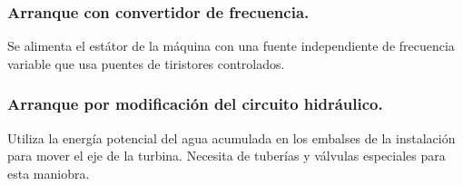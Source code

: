 			\subsubsection{Arranque con convertidor de frecuencia.}
				Se alimenta el estátor de la máquina con una fuente independiente de frecuencia variable que usa puentes de tiristores controlados.
				
			\subsubsection{Arranque por modificación del circuito hidráulico.}
				Utiliza la energía potencial del agua acumulada en los embalses de la instalación para mover el eje de la turbina. Necesita de tuberías y válvulas especiales para esta maniobra.